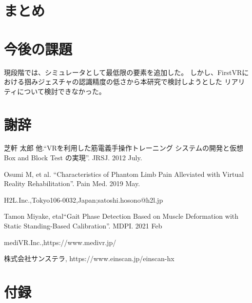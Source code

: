 \documentclass{ltjsreport}
\begin{document}
\chapter{まとめ}

\chapter{今後の課題}
	現段階では、シミュレータとして最低限の要素を追加した。
	しかし、FirstVRにおける掴みジェスチャの認識精度の低さから本研究で検討しようとした
	リアリティについて検討できなかった。
\clearpage

\chapter*{謝辞}

\begin{thebibliography}{99}

	芝軒 太郎 他.``VRを利用した筋電義手操作トレーニング
	システムの開発と仮想 Box and Block Test の実現''.
	JRSJ. 2012 July.

	Osumi M, et al.
	``Characteristics of Phantom Limb Pain Alleviated
	with Virtual Reality Rehabilitation''.
	Pain Med. 2019 May.

	H2L.Inc.,Tokyo106-0032,Japan;satoshi.hosono@h2l.jp

	Tamon Miyake, etal``Gait Phase Detection Based on Muscle Deformation
	with Static Standing-Based Calibration''.
	MDPI. 2021 Feb

	mediVR.Inc.,https://www.medivr.jp/

	株式会社サンステラ, https://www.einscan.jp/einscan-hx



\end{thebibliography}
\chapter*{付録}
\setcounter{page}{1}
\end{document}
